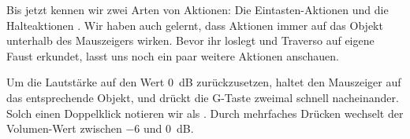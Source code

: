 Bis jetzt kennen wir zwei Arten von Aktionen: Die Eintasten-Aktionen  und die Halteaktionen . Wir haben auch gelernt, dass Aktionen immer auf das Objekt unterhalb des Mauszeigers wirken. Bevor ihr loslegt und Traverso auf eigene Faust erkundet, lasst uns noch ein paar weitere Aktionen anschauen.

Um die Lautstärke auf den Wert 0~dB zurückzusetzen, haltet den Mauszeiger auf das entsprechende Objekt, und drückt die G-Taste zweimal schnell nacheinander. Solch einen Doppelklick notieren wir als . Durch mehrfaches Drücken wechselt der Volumen-Wert zwischen $-6$ und 0~dB.
